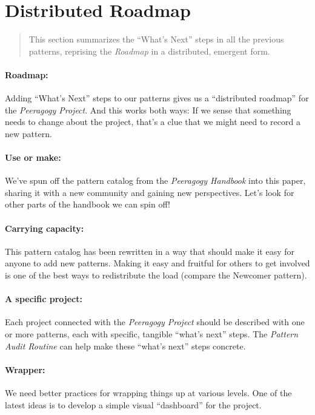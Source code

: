\section{Distributed Roadmap}

\begin{quote}
This section summarizes the ``What's Next'' steps in all the previous
patterns, reprising the \emph{Roadmap} in a distributed, emergent form.
\end{quote}

\paragraph{Roadmap:} Adding ``What's Next'' steps to our patterns gives us a ``distributed roadmap'' for the \emph{Peeragogy Project}.  And this works both ways:  
If we sense that something needs to change about the project, that's a
clue that we might need to record a new pattern.

\paragraph{Use or make:} 
We've spun off the pattern catalog from the \emph{Peeragogy Handbook} into this paper, sharing it with a new community and gaining new perspectives.  Let's look for other parts of the handbook we can spin off!

\paragraph{Carrying capacity:} This pattern catalog has been rewritten in a way that should make it
easy for anyone to add new patterns. Making it easy and fruitful for
others to get involved is one of the best ways to redistribute the load
(compare the Newcomer pattern).

\paragraph{A specific project:} 
 Each project connected with the \emph{Peeragogy Project} should be described with one or more patterns, each with specific, tangible ``what's next'' steps.  The \emph{Pattern Audit Routine} can help make these ``what's next'' steps concrete.

\paragraph{Wrapper:}  We need better practices for wrapping things up at
various levels.  One of the latest ideas is to develop a simple visual
``dashboard'' for the project.


